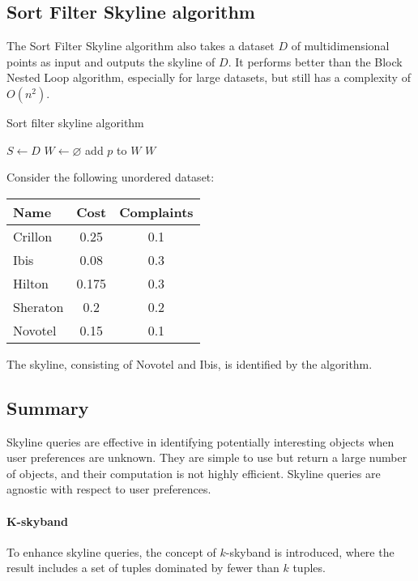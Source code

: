 \subsection{Sort Filter Skyline algorithm}
The Sort Filter Skyline algorithm also takes a dataset $D$ of multidimensional points as input and outputs the skyline of $D$. 
It performs better than the Block Nested Loop algorithm, especially for large datasets, but still has a complexity of $O(n^2)$.
\begin{algorithm}[H]
    \caption{Sort filter skyline algorithm}
        \begin{algorithmic}[1]
            \State $S \leftarrow D$
            \State $W \leftarrow \varnothing$
                    \State add $p$ to $W$
                \EndIf
            \EndFor
            \State \Return $W$
        \end{algorithmic}
\end{algorithm}
\begin{example}
    Consider the following unordered dataset: 
    \begin{table}[H]
        \centering
        \begin{tabular}{lcc}
        \textbf{Name}                 & \textbf{Cost} & \textbf{Complaints} \\ \hline
        \multicolumn{1}{l|}{Crillon}  & 0.25  & 0.1        \\
        \multicolumn{1}{l|}{Ibis}     & 0.08  & 0.3        \\
        \multicolumn{1}{l|}{Hilton}   & 0.175 & 0.3        \\
        \multicolumn{1}{l|}{Sheraton} & 0.2   & 0.2        \\
        \multicolumn{1}{l|}{Novotel}  & 0.15  & 0.1       
        \end{tabular}
    \end{table}
    The skyline, consisting of Novotel and Ibis, is identified by the algorithm.
\end{example}

\subsection{Summary}
Skyline queries are effective in identifying potentially interesting objects when user preferences are unknown. 
They are simple to use but return a large number of objects, and their computation is not highly efficient. 
Skyline queries are agnostic with respect to user preferences.

\paragraph*{K-skyband} 
To enhance skyline queries, the concept of $k$-skyband is introduced, where the result includes a set of tuples dominated by fewer than $k$ tuples.